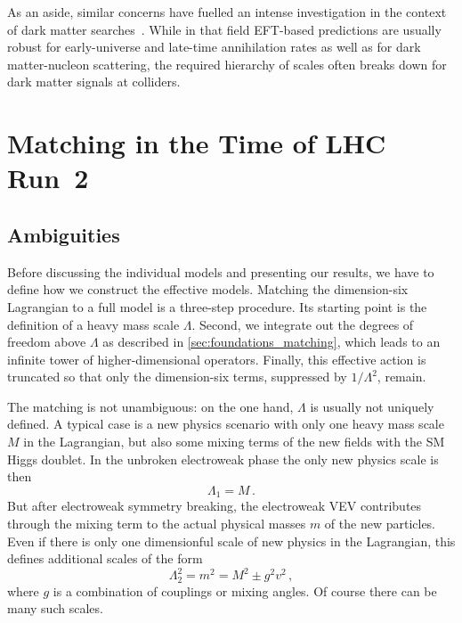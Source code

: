 As an aside, similar concerns have fuelled an intense investigation in
the context of dark matter searches~\cite{Shoemaker:2011vi,
  Busoni:2013lha, Buchmueller:2013dya, Busoni:2014sya, Racco:2015dxa,
  Bauer:2016pug}.  While in that field EFT-based predictions are
usually robust for early-universe and late-time annihilation rates as
well as for dark matter-nucleon scattering, the required hierarchy of
scales often breaks down for dark matter signals at colliders.



\section{Matching in the Time of LHC Run~2}
\label{sec:validity_matching}

\subsection{Ambiguities}

Before discussing the individual models and presenting our results, we
have to define how we construct the effective models.  Matching the
dimension-six Lagrangian to a full model is a three-step procedure.
Its starting point is the definition of a heavy mass scale $\Lambda$.
Second, we integrate out the degrees of freedom above $\Lambda$ as
described in \autoref{sec:foundations_matching}, which leads to an
infinite tower of higher-dimensional operators.  Finally, this
effective action is truncated so that only the dimension-six terms,
suppressed by $1 / \Lambda^2$, remain.

The matching is not unambiguous: on the one hand, $\Lambda$ is usually
not uniquely defined. A typical case is a new physics scenario with
only one heavy mass scale $M$ in the Lagrangian, but also some mixing
terms of the new fields with the SM Higgs doublet. In the unbroken
electroweak phase the only new physics scale is then
%
\begin{equation}
  \Lambda_1 = M \,.
\end{equation}
%
But after electroweak symmetry breaking, the electroweak VEV
contributes through the mixing term to the actual physical masses $m$
of the new particles. Even if there is only one dimensionful scale of
new physics in the Lagrangian, this defines additional scales of the
form
%
\begin{equation}
  \Lambda_2^2 = m^2 = M^2 \pm g^2 v^2 \,,
\end{equation}
%
where $g$ is a combination of couplings or mixing angles. Of course
there can be many such scales.

